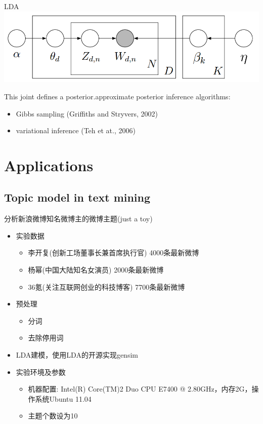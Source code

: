 \documentclass[hyperref={unicode}]{beamer}
\begin{document}
\begin{CJK}{UTF8}{gkai}
\begin{frame}{LDA}
  \includegraphics[scale=0.4]{lda}
\begin{block}{This joint defines a posterior.approximate posterior inference algorithms:}
  \begin{itemize}
    \item Gibbs sampling (Griffiths and Stryvers, 2002)
     \item variational inference (Teh et at., 2006)
\end{itemize}
\end{block}
\end{frame}

\section{Applications}
\subsection{Topic model in text mining}
\begin{frame}{分析新浪微博知名微博主的微博主题(just a toy)}
\begin{itemize}
\item 实验数据
  \begin{itemize}
  \item 李开复(创新工场董事长兼首席执行官) 4000条最新微博
  \item 杨幂(中国大陆知名女演员) 2000条最新微博
  \item 36氪(关注互联网创业的科技博客) 7700条最新微博
  \end{itemize}
\item 预处理
\begin{itemize}
\item 分词
\item 去除停用词
\end{itemize}
\item LDA建模，使用LDA的开源实现gensim
\item 实验环境及参数
\begin{itemize}
\item 机器配置: Intel(R) Core(TM)2 Duo CPU E7400 @ 2.80GHz，内存2G，操作系统Ubuntu 11.04
\item 主题个数设为10
\end{itemize}
\end{itemize}
\end{frame}


\end{CJK}
\end{document}
